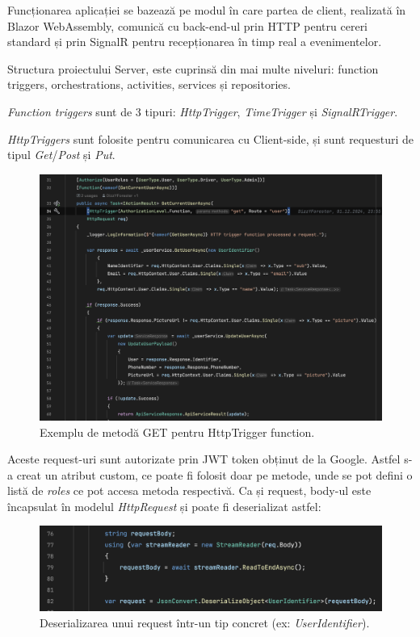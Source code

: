 Funcționarea aplicației se bazează pe modul în care partea de client, realizată în Blazor WebAssembly, comunică cu back-end-ul
prin HTTP pentru cereri standard și prin SignalR pentru recepționarea în timp real a evenimentelor.

Structura proiectului Server, este cuprinsă din mai multe niveluri: function triggers, orchestrations,
activities, services și repositories.

\textit{Function triggers} sunt de 3 tipuri: \textit{HttpTrigger}, \textit{TimeTrigger} și \textit{SignalRTrigger}.

\textit{HttpTriggers} sunt folosite pentru comunicarea cu Client-side, și sunt requesturi de tipul \textit{Get}/\textit{Post} și \textit{Put}.
\begin{figure}[H]
    \centering
    \includegraphics[width=16cm]{Assets/HttpTrigger.png}
    \caption{Exemplu de metodă GET pentru HttpTrigger function.}
    \label{fig:HttpTrigger}
\end{figure}

Aceste request-uri sunt autorizate prin JWT token obținut de la Google. Astfel s-a creat un atribut custom,
ce poate fi folosit doar pe metode, unde se pot defini o listă de \textit{roles} ce pot
accesa metoda respectivă.
Ca și request, body-ul este încapsulat în modelul \textit{HttpRequest} și poate fi deserializat
astfel:
\begin{figure}[H]
    \centering
    \includegraphics[width=14cm]{Assets/DeserializeRequest.png}
    \caption{Deserializarea unui request într-un tip concret (ex: \textit{UserIdentifier}).}
    \label{fig:DeserializeRequest}
\end{figure}


